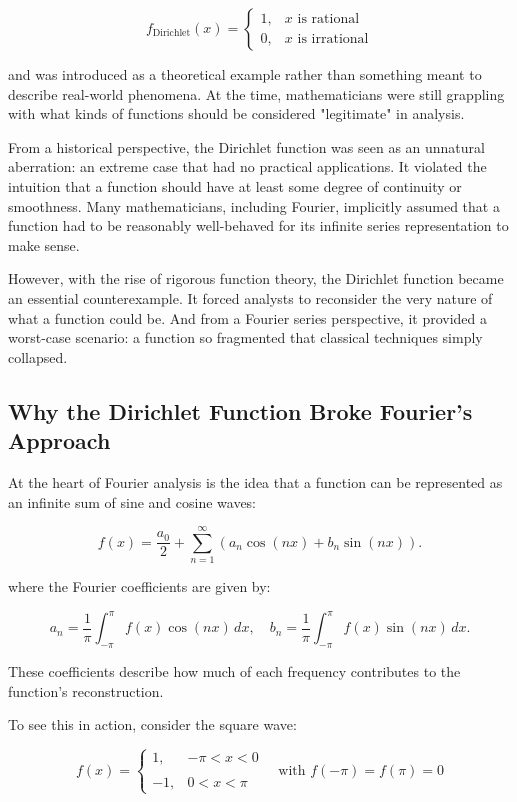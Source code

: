 \[
f_{\text{Dirichlet}}(x) =
\begin{cases} 
1, & x \text{ is rational} \\
0, & x \text{ is irrational}
\end{cases}
\]

and was introduced as a theoretical example rather than something meant to describe real-world phenomena. At the time, mathematicians were still grappling with what kinds of functions should be considered "legitimate" in analysis. 

From a historical perspective, the Dirichlet function was seen as an unnatural aberration: an extreme case that had no practical applications. It violated the intuition that a function should have at least some degree of continuity or smoothness. Many mathematicians, including Fourier, implicitly assumed that a function had to be reasonably well-behaved for its infinite series representation to make sense.

However, with the rise of rigorous function theory, the Dirichlet function became an essential counterexample. It forced analysts to reconsider the very nature of what a function could be. And from a Fourier series perspective, it provided a worst-case scenario: a function so fragmented that classical techniques simply collapsed.

\subsection{Why the Dirichlet Function Broke Fourier's Approach}

At the heart of Fourier analysis is the idea that a function can be represented as an infinite sum of sine and cosine waves:

\[
f(x) = \frac{a_0}{2} + \sum_{n=1}^{\infty} \left( a_n \cos(nx) + b_n \sin(nx) \right).
\]

where the Fourier coefficients are given by:

\[
a_n = \frac{1}{\pi} \int_{-\pi}^{\pi} f(x) \cos(n x) \,dx, \quad
b_n = \frac{1}{\pi} \int_{-\pi}^{\pi} f(x) \sin(n x) \,dx.
\]

These coefficients describe how much of each frequency contributes to the function’s reconstruction.

To see this in action, consider the square wave:

\[
f(x) = 
\begin{cases}
1, & -\pi < x < 0 \\\\
-1, & 0 < x < \pi
\end{cases}
\quad \text{with } f(-\pi) = f(\pi) = 0
\]

